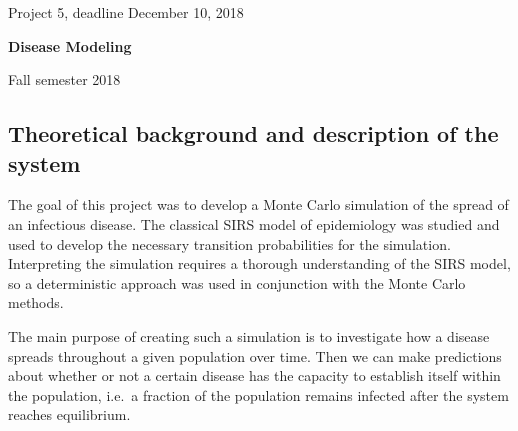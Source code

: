 \documentclass[%
oneside,                 %
final,                   %
10pt]{article}
\begin{document}

\newcommand{\exercisesection}[1]{\subsection*{#1}}






\thispagestyle{empty}

\begin{center}
{\LARGE\bf
\begin{spacing}{1.25}
Project 5, deadline  December 10, 2018
\end{spacing}
}
\end{center}


\begin{center}
{\bf Disease Modeling${}^{}$} \\ [0mm]
\end{center}

\begin{center}
\end{center}
    

\begin{center}
Fall semester 2018
\end{center}

\vspace{1cm}


\subsection{Theoretical background and description of the system}

The goal of this project was to develop a Monte Carlo simulation of
the spread of an infectious disease. The classical SIRS model of
epidemiology was studied and used to develop the necessary transition
probabilities for the simulation. Interpreting the simulation requires
a thorough understanding of the SIRS model, so a deterministic
approach was used in conjunction with the Monte Carlo methods. 

The main purpose of creating such a simulation is to investigate how a
disease spreads throughout a given population over time. Then we can
make predictions about whether or not a certain disease has the
capacity to establish itself within the population, i.e.~a fraction of
the population remains infected after the system reaches
equilibrium. 
\end{document}
